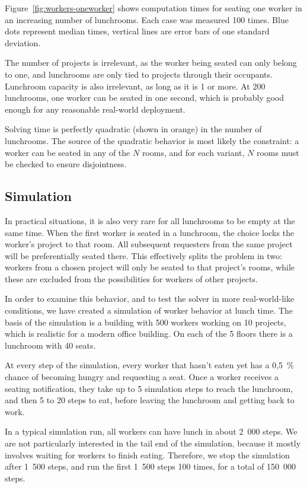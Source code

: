 Figure~\ref{fig:workers-oneworker} shows computation times for seating one worker in an
increasing number of lunchrooms. Each case was measured 100 times. Blue dots represent
median times, vertical lines are error bars of one standard deviation.

The number of projects is irrelevant, as the worker being seated can only belong to one,
and lunchrooms are only tied to projects through their occupants. Lunchroom capacity is
also irrelevant, as long as it is 1 or more. At 200 lunchrooms, one worker can be seated
in one second, which is probably good enough for any reasonable real-world deployment.

Solving time is perfectly quadratic (shown in orange) in the number of lunchrooms. The
source of the quadratic behavior is most likely the  constraint: a
worker can be seated in any of the $N$ rooms, and for each variant, $N$ rooms must be
checked to ensure disjointness.


\subsection{Simulation}
\label{eval:example:simulation}

In practical situations, it is also very rare for all lunchrooms to be empty at the
same time. When the first worker is seated in a lunchroom, the choice locks the
worker's project to that room. All subsequent requesters from the same project will be
preferentially seated there. This effectively splits the problem in two: workers from a
chosen project will only be seated to that project's rooms, while these are excluded
from the possibilities for workers of other projects.

In order to examine this behavior, and to test the solver in more real-world-like
conditions, we have created a simulation of worker behavior at lunch time. The basis of
the simulation is a building with 500 workers working on 10 projects, which is realistic
for a modern office building. On each of the 5 floors there is a lunchroom with 40
seats.

At every step of the simulation, every worker that hasn't eaten yet has a 0,5~\% chance
of becoming hungry and requesting a seat. Once a worker receives a seating notification,
they take up to 5 simulation steps to reach the lunchroom, and then 5 to 20 steps to
eat, before leaving the lunchroom and getting back to work.

In a typical simulation run, all workers can have lunch in about 2~000 steps. We are not
particularly interested in the tail end of the simulation, because it mostly involves
waiting for workers to finish eating. Therefore, we stop the simulation after 1~500
steps, and run the first 1~500 steps 100 times, for a total of 150~000 steps.

